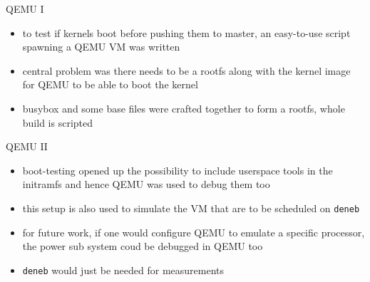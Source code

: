 \begin{frame}{QEMU I}
	\begin{itemize}
		\item to test if kernels boot before pushing them to master, an easy-to-use script spawning a QEMU VM was written
		\item central problem was there needs to be a rootfs along with the kernel image for QEMU to be able to boot the kernel
		\item busybox and some base files were crafted together to form a rootfs, whole build is scripted
	\end{itemize}
\end{frame}

\begin{frame}{QEMU II}
	\begin{itemize}
		\item boot-testing opened up the possibility to include userspace tools in the initramfs and hence QEMU was used to debug them too
		\item this setup is also used to simulate the VM that are to be scheduled on \texttt{deneb}
		\item for future work, if one would configure QEMU to emulate a specific processor, the power sub system coud be debugged in QEMU too
		\item \texttt{deneb} would just be needed for measurements
	\end{itemize}
\end{frame}
